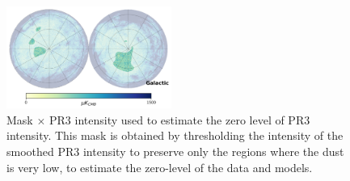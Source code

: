\documentclass[twocolumn]{aastex631}
\begin{document}
\begin{figure}[ht!]
    \centering
    \includegraphics[width=0.48\textwidth]{figures/mask_intxPR3_zero_lvl.png}
    \caption{Mask $\times$ PR3 intensity used to estimate the zero level of PR3 intensity. This mask is obtained by thresholding the intensity of the smoothed PR3 intensity to preserve only the regions where the dust is very low, to estimate the zero-level of the data and models.}
    \label{fig:mask_zero_lvl_int}
\end{figure}
\end{document}
